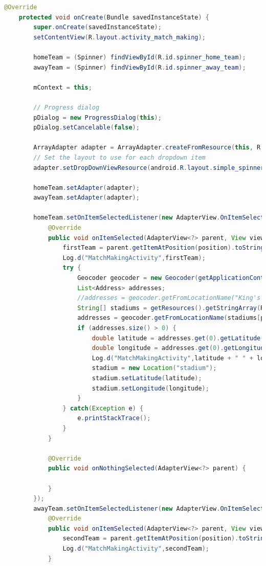 \documentclass{article}
\begin{document}
\begin{landscape}
\begin{lstlisting}[language=Java,basicstyle=\tiny]
    @Override
    protected void onCreate(Bundle savedInstanceState) {
        super.onCreate(savedInstanceState);
        setContentView(R.layout.activity_match_making);

        homeTeam = (Spinner) findViewById(R.id.spinner_home_team);
        awayTeam = (Spinner) findViewById(R.id.spinner_away_team);

        mContext = this;

        // Progress dialog
        pDialog = new ProgressDialog(this);
        pDialog.setCancelable(false);

        ArrayAdapter adapter = ArrayAdapter.createFromResource(this, R.array.premier_league, android.R.layout.simple_spinner_item);
        // Set the layout to use for each dropdown item
        adapter.setDropDownViewResource(android.R.layout.simple_spinner_dropdown_item);

        homeTeam.setAdapter(adapter);
        awayTeam.setAdapter(adapter);

        homeTeam.setOnItemSelectedListener(new AdapterView.OnItemSelectedListener() {
            @Override
            public void onItemSelected(AdapterView<?> parent, View view, int position, long id) {
                firstTeam = parent.getItemAtPosition(position).toString();
                Log.d("MatchMakingActivity",firstTeam);
                try {
                    Geocoder geocoder = new Geocoder(getApplicationContext());
                    List<Address> addresses;
                    //addresses = geocoder.getFromLocationName("King's Park Dr, Bournemouth BH7 7AF", 1);
                    String[] stadiums = getResources().getStringArray(R.array.premier_league_stadiums);
                    addresses = geocoder.getFromLocationName(stadiums[position], 1);
                    if (addresses.size() > 0) {
                        double latitude = addresses.get(0).getLatitude();
                        double longitude = addresses.get(0).getLongitude();
                        Log.d("MatchMakingActivity",latitude + " " + longitude);
                        stadium = new Location("stadium");
                        stadium.setLatitude(latitude);
                        stadium.setLongitude(longitude);
                    }
                } catch(Exception e) {
                    e.printStackTrace();
                }
            }

            @Override
            public void onNothingSelected(AdapterView<?> parent) {

            }
        });
        awayTeam.setOnItemSelectedListener(new AdapterView.OnItemSelectedListener() {
            @Override
            public void onItemSelected(AdapterView<?> parent, View view, int position, long id) {
                secondTeam = parent.getItemAtPosition(position).toString();
                Log.d("MatchMakingActivity",secondTeam);
            }


\end{lstlisting}
\end{landscape}
\end{document}
